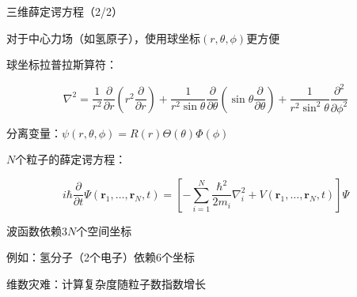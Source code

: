 \begin{frame}{三维薛定谔方程（2/2）}
    \begin{iqbitemize}
    \item 对于中心力场（如氢原子），使用球坐标$(r,\theta,\phi)$更方便
    \item 球坐标拉普拉斯算符：
    \end{iqbitemize}
      \[
        \nabla^2 = \dfrac{1}{r^2}\dfrac{\partial}{\partial r}\left(r^2\dfrac{\partial}{\partial r}\right) + \dfrac{1}{r^2\sin\theta}\dfrac{\partial}{\partial\theta}\left(\sin\theta\dfrac{\partial}{\partial\theta}\right) + \dfrac{1}{r^2\sin^2\theta}\dfrac{\partial^2}{\partial\phi^2}
      \]
    \begin{iqbitemize}
    \item 分离变量：$\psi(r,\theta,\phi) = R(r)\Theta(\theta)\Phi(\phi)$
    \end{iqbitemize}
    \iqbsmallsep

    \begin{iqbitemize}
    \item $N$个粒子的薛定谔方程：
    \end{iqbitemize}
      \[
        i\hbar\dfrac{\partial}{\partial t}\Psi(\mathbf{r}_1,\ldots,\mathbf{r}_N,t) = \left[-\sum_{i=1}^{N}\dfrac{\hbar^2}{2m_i}\nabla_i^2 + V(\mathbf{r}_1,\ldots,\mathbf{r}_N,t)\right]\Psi
      \]
    \begin{iqbitemize}
    \item 波函数依赖$3N$个空间坐标
    \item 例如：氢分子（2个电子）依赖6个坐标
    \item 维数灾难：计算复杂度随粒子数指数增长
    \end{iqbitemize}
    \iqbmicrosep

  

\end{frame}

